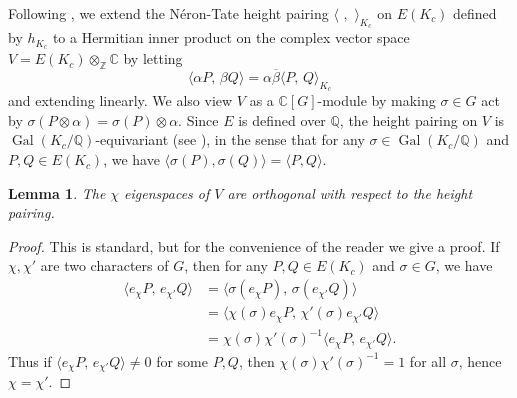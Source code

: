\documentclass[preprint,12pt]{elsarticle}
\newcommand{\Q}{\mathbb{Q}}
\newcommand{\C}{\mathbb{C}}
\newcommand{\Z}{\mathbb{Z}}
\newcommand{\tensor}{\otimes}
\DeclareMathOperator{\Gal}{Gal}
\theoremstyle{plain}
\newtheorem{lemma}[theorem]{Lemma}
\theoremstyle{definition}
\begin{document}
Following \cite[(10.1)]{gross:heegnerX0N}, we extend the N\'eron-Tate height pairing
$\langle \,\,, \,\, \rangle_{K_c}$ on $E(K_c)$ defined by $h_{K_c}$ to a Hermitian
inner product on the complex vector space $V = E(K_c) \tensor_{\Z} \C$ by letting
\begin{equation}\label{eqn:hermitian}
  \langle \alpha P,\, \beta Q\rangle = \alpha \overline{\beta} \langle P,\, Q\rangle_{K_c}
\end{equation}
and extending linearly.  We also view $V$ as a $\C[G]$-module by
making $\sigma\in G$ act by $\sigma(P \tensor \alpha) = \sigma(P)
\tensor \alpha$.  Since $E$ is defined over $\Q$, the height pairing
on $V$ is $\Gal(K_c/\Q)$-equivariant (see
\cite[Lem.~VIII.5.10]{silverman:aec}), in the sense that
for any $\sigma \in \Gal(K_c/\Q)$ and $P,Q\in E(K_c)$, we have
$\langle \sigma(P), \sigma(Q)\rangle = \langle P, Q\rangle$.

\begin{lemma}\label{lem:ortho}
The $\chi$ eigenspaces of $V$
are orthogonal with respect to the height pairing.
\end{lemma}
\begin{proof}
This is standard, but for the convenience of the reader we give a proof.
If $\chi,
\chi'$ are two characters of $G$, then for any $P,Q\in E(K_c)$ and
$\sigma\in G$, we have
\begin{align*}
  \langle e_{\chi} P,\, e_{\chi'} Q\rangle &=
    \langle\sigma(e_\chi P),\, \sigma(e_{\chi'} Q) \rangle \\
   &=  \langle \chi(\sigma)e_\chi P,\, \chi'(\sigma)e_{\chi'} Q \rangle\\ 
  & = \chi(\sigma)\chi'(\sigma)^{-1} \langle e_{\chi} P,\, e_{\chi'} Q\rangle.
 \end{align*}
 Thus if $\langle e_{\chi} P,\, e_{\chi'} Q\rangle \neq 0$ for some $P,Q$, then 
$\chi(\sigma)\chi'(\sigma)^{-1}=1$ for all $\sigma$, hence $\chi=\chi'$.
\end{proof}
\end{document}
